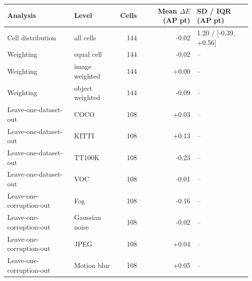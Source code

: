 \begin{tabular}{llrrl}
\toprule
Analysis & Level & Cells & Mean $\Delta E$ (AP pt) & SD / IQR (AP pt) \\
\midrule
Cell distribution & all cells & 144 & -0.02 & 1.20 / [-0.39, +0.56] \\
Weighting & equal cell & 144 & -0.02 & -- \\
Weighting & image weighted & 144 & +0.00 & -- \\
Weighting & object weighted & 144 & -0.09 & -- \\
Leave-one-dataset-out & COCO & 108 & +0.03 & -- \\
Leave-one-dataset-out & KITTI & 108 & +0.13 & -- \\
Leave-one-dataset-out & TT100K & 108 & -0.23 & -- \\
Leave-one-dataset-out & VOC & 108 & -0.01 & -- \\
Leave-one-corruption-out & Fog & 108 & -0.16 & -- \\
Leave-one-corruption-out & Gaussian noise & 108 & -0.02 & -- \\
Leave-one-corruption-out & JPEG & 108 & +0.04 & -- \\
Leave-one-corruption-out & Motion blur & 108 & +0.05 & -- \\
\bottomrule
\end{tabular}

